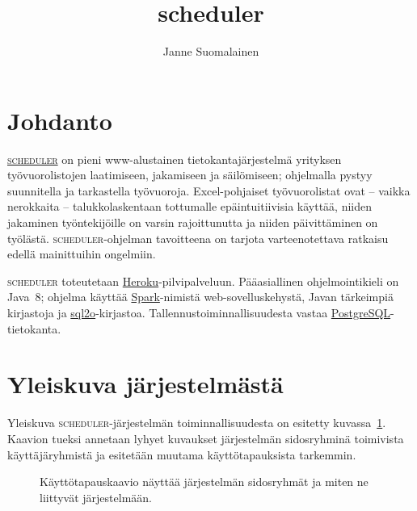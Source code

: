 \documentclass[10pt,titlepage,hidelinks]{scrartcl}
\newcommand{\scheduler}{\textsc{scheduler}}
\begin{document}
\title{scheduler}
\author{Janne Suomalainen}
\maketitle

\tableofcontents\clearpage

\section{Johdanto}

\href{https://onlinescheduler.herokuapp.com/}{\scheduler{}} on pieni www-alustainen tietokantajärjestelmä yrityksen työvuorolistojen laatimiseen, jakamiseen ja säilömiseen; ohjelmalla pystyy suunnitella ja tarkastella työvuoroja. Excel-pohjaiset työvuorolistat ovat -- vaikka nerokkaita -- talukkolaskentaan tottumalle epäintuitiivisia käyttää, niiden jakaminen työntekijöille on varsin rajoittunutta ja niiden päivittäminen on työlästä. \scheduler{}-ohjelman tavoitteena on tarjota varteenotettava ratkaisu edellä mainittuihin ongelmiin.

\scheduler{} toteutetaan \href{https://www.heroku.com/}{Heroku}-pilvipalveluun. Pääasiallinen ohjelmointikieli on Java~8; ohjelma käyttää \href{http://sparkjava.com/}{Spark}-nimistä web-sovelluskehystä, Javan tärkeimpiä kirjastoja ja \href{http://www.sql2o.org/}{sql2o}-kirjastoa. Tallennustoiminnallisuudesta vastaa \href{https://www.postgresql.org/}{PostgreSQL}-tietokanta.

\section{Yleiskuva järjestelmästä}

Yleiskuva \scheduler{}-järjestelmän toiminnallisuudesta on esitetty kuvassa~\ref{fig:kayttotapaukset}. Kaavion tueksi annetaan lyhyet kuvaukset järjestelmän sidosryhminä toimivista käyttäjäryhmistä ja esitetään muutama käyttötapauksista tarkemmin.

\begin{figure}[t]
\centering
{}
\caption{Käyttötapauskaavio näyttää järjestelmän sidosryhmät ja miten ne liittyvät järjestelmään.}
\label{fig:kayttotapaukset}
\end{figure}
\end{document}
